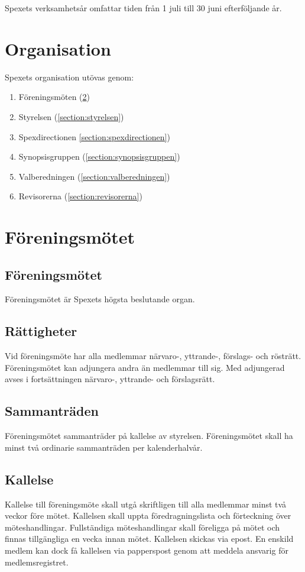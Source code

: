 \documentclass[a4paper]{article}
\begin{document}
Spexets verksamhetsår omfattar tiden från 1 juli till 30 juni efterföljande år.

\section{Organisation}
Spexets organisation utövas genom:

\begin{enumerate}
  \item Föreningsmöten (\ref{section:föreningsmötet})
  \item Styrelsen (\ref{section:styrelsen})
  \item Spexdirectionen \ref{section:spexdirectionen})
  \item Synopsisgruppen (\ref{section:synopsisgruppen})
  \item Valberedningen (\ref{section:valberedningen})
  \item Revisorerna (\ref{section:revisorerna})
\end{enumerate}

\section{Föreningsmötet}
\label{section:föreningsmötet}

\subsection{Föreningsmötet}
Föreningsmötet är Spexets högsta beslutande organ.

\subsection{Rättigheter}
Vid föreningsmöte har alla medlemmar närvaro-, yttrande-, förslags- och rösträtt. Föreningsmötet kan adjungera andra än medlemmar till sig. Med adjungerad avses i fortsättningen närvaro-, yttrande- och förslagsrätt.

\subsection{Sammanträden}
Föreningsmötet sammanträder på kallelse av styrelsen. Föreningsmötet skall ha minst två ordinarie sammanträden per kalenderhalvår.

\subsection{Kallelse}
Kallelse till föreningsmöte skall utgå skriftligen till alla medlemmar minst två veckor före mötet. Kallelsen skall uppta föredragningslista och förteckning över möteshandlingar. Fullständiga möteshandlingar skall föreligga på mötet och finnas tillgängliga en vecka innan mötet.\newline
\newline
Kallelsen skickas via epost. En enskild medlem kan dock få kallelsen via papperspost genom att meddela ansvarig för medlemsregistret.
\end{document}
